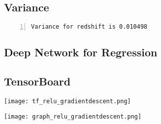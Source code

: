 \subsection{Variance}
\begin{lstlisting}[language={},numbers=left,numberstyle=\tiny,frame = single]
Variance for redshift is 0.010498
\end{lstlisting}

\subsection{Deep Network for Regression}

\subsection{TensorBoard}


\texttt{[image: tf\_relu\_gradientdescent.png]}

\texttt{[image: graph\_relu\_gradientdescent.png]}
